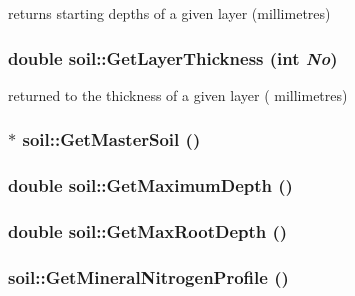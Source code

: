 returns starting depths of a given layer (millimetres) \hypertarget{classsoil_a2036fe29081a982325d1c6b8b644db12}{
\subsubsection[{GetLayerThickness}]{\setlength{\rightskip}{0pt plus 5cm}double soil::GetLayerThickness (int {\em No})}}
\label{classsoil_a2036fe29081a982325d1c6b8b644db12}


returned to the thickness of a given layer ( millimetres) \hypertarget{classsoil_a5735cf071bd7f3682a872fb971df00d7}{
\subsubsection[{GetMasterSoil}]{$\ast$ soil::GetMasterSoil ()}}
\label{classsoil_a5735cf071bd7f3682a872fb971df00d7}
\hypertarget{classsoil_a36b98f1dc475f9116205d93b64c84b67}{
\subsubsection[{GetMaximumDepth}]{\setlength{\rightskip}{0pt plus 5cm}double soil::GetMaximumDepth ()}}
\label{classsoil_a36b98f1dc475f9116205d93b64c84b67}
\hypertarget{classsoil_a9f4bafd4dfed43438f4310e06dac6933}{
\subsubsection[{GetMaxRootDepth}]{\setlength{\rightskip}{0pt plus 5cm}double soil::GetMaxRootDepth ()}}
\label{classsoil_a9f4bafd4dfed43438f4310e06dac6933}
\hypertarget{classsoil_a19737ddea2fab36e4ddba698aa690a23}{
\subsubsection[{GetMineralNitrogenProfile}]{ soil::GetMineralNitrogenProfile ()}}
